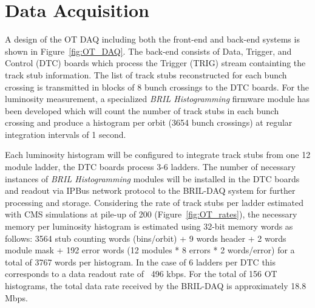 \section{Data Acquisition}

A design of the OT DAQ including both the front-end and back-end systems is shown in Figure~\ref{fig:OT_DAQ}.
The back-end consists of Data, Trigger, and Control (DTC) boards which process the Trigger (TRIG) stream containting the track stub information. 
The list of track stubs reconstructed for each bunch crossing is transmitted in blocks of 8 bunch crossings to the DTC boards.
For the luminosity measurement, a specialized {\it BRIL Histogramming} firmware module has been developed which will count the number of track stubs in each bunch crossing and produce a histogram per orbit (3654 bunch crossings) at regular integration intervals of 1 second.

Each luminosity histogram will be configured to integrate track stubs from one 12 module ladder, the DTC boards process 3-6 ladders.
The number of necessary instances of  {\it BRIL Histogramming} modules will be installed in the DTC boards and readout via IPBus network protocol to the BRIL-DAQ system for further processing and storage.
Considering the rate of track stubs per ladder estimated with CMS simulations at pile-up of 200  (Figure~\ref{fig:OT_rates}),  the necessary memory per luminosity histogram is estimated using 32-bit memory words as follows: 3564 stub counting words (bins/orbit) + 9 words header + 2 words module mask + 192 error words (12 modules * 8 errors * 2 words/error) for a total of 3767 words per histogram.
In the case of 6 ladders per DTC this corresponds to a data readout rate of ~496 kbps.
For the total of 156 OT histograms, the total data rate received by the BRIL-DAQ is approximately 18.8 Mbps.



